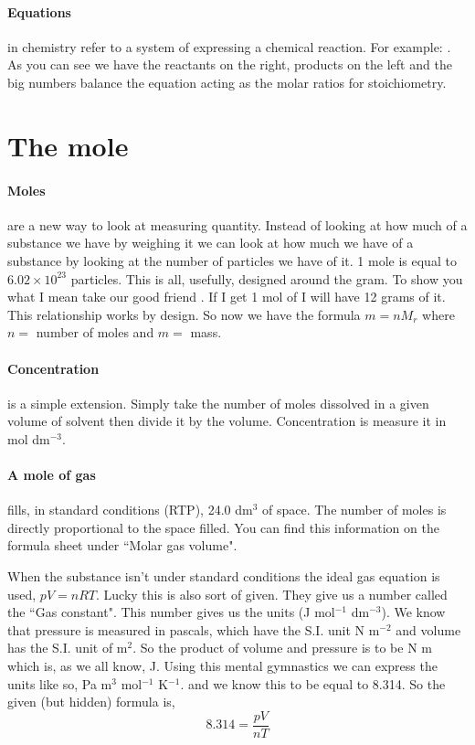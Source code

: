 	 
	 \paragraph{Equations} in chemistry refer to a system of expressing a chemical reaction. For example: . As you can see we have the reactants on the right, products on the left and the big numbers balance the equation acting as the molar ratios for stoichiometry.
	 
\section{The mole}
	\paragraph{Moles} are a new way to look at measuring quantity. Instead of looking at how much of a substance we have by weighing it we can look at how much we have of a substance by looking at the number of particles we have of it. 1 mole is equal to $6.02\times 10^{23}$ particles. This is all, usefully, designed around the gram. To show you what I mean take our good friend . If I get 1 mol of  I will have 12 grams of it. This relationship works by design. So now we have the formula $m = nM_r$ where $n =$ number of moles and $m =$ mass.
	 
	\paragraph{Concentration} is a simple extension. Simply take the number of moles dissolved in a given volume of solvent then divide it by the volume. Concentration is measure it in mol dm$^{-3}$.
     
	\paragraph{A mole of gas} fills, in standard conditions (RTP), 24.0 dm$^3$ of space. The number of moles is directly proportional to the space filled. You can find this information on the formula sheet under ``Molar gas volume".
     
	When the substance isn't under standard conditions the ideal gas equation is used, $pV = nRT$. Lucky this is also sort of given. They give us a number called the ``Gas constant". This number gives us the units (J mol$^{-1}$ dm$^{-3}$). We know that pressure is measured in pascals, which have the S.I. unit N m$^{-2}$ and volume has the S.I. unit of m$^2$. So the product of volume and pressure is to be N m which is, as we all know, J. Using this mental gymnastics we can express the units like so, Pa m$^3$ mol$^{-1}$ K$^{-1}$. and we know this to be equal to 8.314. So the given (but hidden) formula is,
	\begin{equation}
		8.314 = \frac{pV}{nT}
	\end{equation}
	
